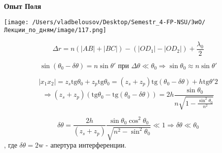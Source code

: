 \documentclass[12pt, a4paper]{report}
\begin{document}
\textbf{Опыт Поля} 

\begin{center}
    \texttt{[image: /Users/vladbelousov/Desktop/Semestr\_4-FP-NSU/ЭиО/Лекции\_по\_дням/image/117.png]}
\end{center}

\[ \Delta r = n \left( |AB| + |BC| \right) - (|O D_1     |- |O D_2   |) + \frac{\lambda_0}{2 }  \] 

\[ \sin (\theta_0 - \delta \theta  )  = n \sin \theta' \text{ при }  \Delta \theta \ll \theta_0 \Rightarrow \sin \theta_0 \approx n \sin \theta'  \] 

\[ |x_1 x_2 | = z_s \mathrm{tg }  \theta_0 + z_p \mathrm{tg }   \theta_0 = (z_s + z_p ) \mathrm{tg }  (\theta_0 - \delta \theta ) + h \mathrm{tg }  \theta ' 2     \] 
\[ \Rightarrow (z_s + z_p )(\mathrm{tg }  \theta_0 - \mathrm{tg }  (\theta_0 - \delta \theta )  ) = 2h \frac{\sin \theta_0 }{n \sqrt{\displaystyle  1 - \frac{\sin  ^2 \theta_0 }{n ^2 } }} \] 

\[ \delta \theta = \frac{2h}{(z_s +z_p )} \frac{\sin  \theta_0 \cos  ^2 \theta_0 }{\sqrt{n ^2 - \sin  ^2 \theta_0 }} \ll 1  \Rightarrow \delta \theta \ll \theta_0  \] 
, где \( \delta \theta  = 2 \text{w} \)  - апертура интерференции.




\ifdefined\mainfile
\else
    
\end{document}

